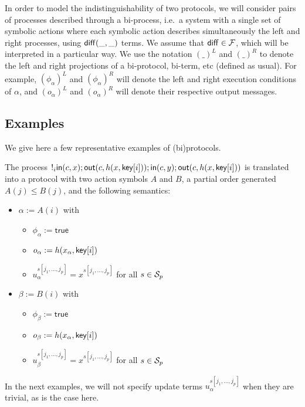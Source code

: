In order to model the indistinguishability of two protocols, we will
consider pairs of processes described through a bi-process, i.e.\ a system with
a single set of symbolic actions where each symbolic action describes
simultaneously the left and right processes, using $\mathsf{diff}(\_,\_)$ terms.
We assume that $\mathsf{diff} \in \mathcal{F}$,
which will be interpreted in a particular way. 
We use the notation $(\_)^L$ and $(\_)^R$ to denote the left and right
projections of a bi-protocol, bi-term, etc (defined as usual).
For example, $(\phi_{\alpha})^L$ and $(\phi_{\alpha})^R$ will denote
the left and right execution conditions of $\alpha$, and
$(o_{\alpha})^L$ and $(o_{\alpha})^R$ will denote their respective
output messages.

\subsection{Examples}

We give here a few representative examples of (bi)protocols.

\begin{example}
  The process $!_i
  \mathsf{in}(c,x);\mathsf{out}(c,h(x,\mathsf{key}[i]));\mathsf{in}(c,y);\mathsf{out}(c,h(x,\mathsf{key}[i]))$
  is translated into a protocol with two action symbols $A$ and $B$,
  a partial order generated $A(j) \leq B(j)$, and the following
  semantics:
  \begin{itemize}
    \item $\alpha := A(i)$ with
      \begin{itemize}
        \item $\phi_\alpha := \mathsf{true}$
        \item $o_\alpha := h(x_\alpha,\mathsf{key}[i])$
        \item $u_\alpha^{s[j_1,\ldots,j_p]} = x^{s[j_1,\ldots,j_p]}$
          for all $s\in\mathcal{S}_p$
      \end{itemize}
    \item $\beta := B(i)$ with
      \begin{itemize}
        \item $\phi_\beta := \mathsf{true}$
        \item $o_\beta := h(x_\alpha,\mathsf{key}[i])$
        \item $u_\beta^{s[j_1,\ldots,j_p]} = x^{s[j_1,\ldots,j_p]}$
          for all $s\in\mathcal{S}_p$
      \end{itemize}
  \end{itemize}
  In the next examples, we will not specify update terms
  $u_\alpha^{s[j_1,\ldots,j_p]}$ when they are trivial, as is the case
  here.
\end{example}

